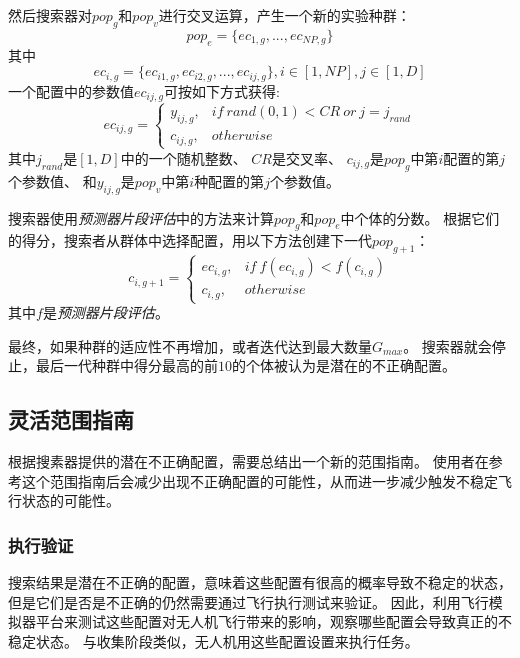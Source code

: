 然后搜索器对$pop_g$和$pop_v$进行交叉运算，产生一个新的实验种群：
\begin{equation}
    pop_e=\{ec_{1,g},...,ec_{NP,g}\}
\end{equation}
其中
\begin{equation}
    ec_{i,g}=\{ec_{i1,g},ec_{i2,g},...,ec_{ij,g}\},i \in [1,NP], j \in[1,D]
\end{equation}
一个配置中的参数值$ec_{ij,g}$可按如下方式获得:
\begin{equation}
    ec_{ij,g}=\begin{cases}
y_{ij,g}, & if~rand(0,1) < CR~or~j=j_{rand}\\
c_{ij,g}, & otherwise
\end{cases}
\end{equation}  
其中$j_{rand}$是$[1,D]$中的一个随机整数、
$CR$是交叉率、
$c_{ij,g}$是$pop_g$中第$i$配置的第$j$个参数值、
和$y_{ij,g}$是$pop_v$中第$i$种配置的第$j$个参数值。

搜索器使用\emph{预测器片段评估}中的方法来计算$pop_g$和$pop_e$中个体的分数。
根据它们的得分，搜索者从群体中选择配置，用以下方法创建下一代$pop_{g+1}$：
 \begin{equation}
    c_{i,g+1}=\begin{cases} 
ec_{i,g}, & if~f(ec_{i,g})<f(c_{i,g})\\
c_{i,g}, & otherwise
\end{cases}
\end{equation}   
其中$f$是\emph{预测器片段评估}。

最终，如果种群的适应性不再增加，或者迭代达到最大数量$G_{max}$。
搜索器就会停止，最后一代种群中得分最高的前$10$的个体被认为是潜在的不正确配置。
    
\subsection{灵活范围指南}
根据搜素器提供的潜在不正确配置，\icsearcher 需要总结出一个新的范围指南。
使用者在参考这个范围指南后会减少出现不正确配置的可能性，从而进一步减少触发不稳定飞行状态的可能性。

\subsubsection{执行验证} 
搜索结果是潜在不正确的配置，意味着这些配置有很高的概率导致不稳定的状态，但是它们是否是不正确的仍然需要通过飞行执行测试来验证。
因此，\icsearcher 利用飞行模拟器平台来测试这些配置对无人机飞行带来的影响，观察哪些配置会导致真正的不稳定状态。
与收集阶段类似，无人机用这些配置设置来执行任务。

